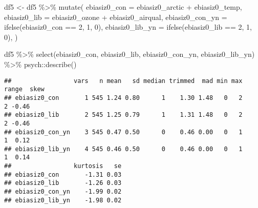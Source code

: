 \documentclass[
]{article}
\newenvironment{Shaded}{\begin{snugshade}}{\end{snugshade}}
\newcommand{\AttributeTok}[1]{\textcolor[rgb]{0.77,0.63,0.00}{#1}}
\newcommand{\DecValTok}[1]{\textcolor[rgb]{0.00,0.00,0.81}{#1}}
\newcommand{\FunctionTok}[1]{\textcolor[rgb]{0.00,0.00,0.00}{#1}}
\newcommand{\NormalTok}[1]{#1}
\newcommand{\OtherTok}[1]{\textcolor[rgb]{0.56,0.35,0.01}{#1}}
\newcommand{\SpecialCharTok}[1]{\textcolor[rgb]{0.00,0.00,0.00}{#1}}
\begin{document}
\begin{Shaded}
\begin{Highlighting}[]
\NormalTok{df5 }\OtherTok{\textless{}{-}}\NormalTok{ df5 }\SpecialCharTok{\%\textgreater{}\%} 
  \FunctionTok{mutate}\NormalTok{(}
    \AttributeTok{ebiasiz0\_con =}\NormalTok{ ebiasiz0\_arctic }\SpecialCharTok{+}\NormalTok{ ebiasiz0\_temp,}
    \AttributeTok{ebiasiz0\_lib =}\NormalTok{ ebiasiz0\_ozone }\SpecialCharTok{+}\NormalTok{ ebiasiz0\_airqual,}
    \AttributeTok{ebiasiz0\_con\_yn =} \FunctionTok{ifelse}\NormalTok{(ebiasiz0\_con }\SpecialCharTok{==} \DecValTok{2}\NormalTok{, }\DecValTok{1}\NormalTok{, }\DecValTok{0}\NormalTok{),}
    \AttributeTok{ebiasiz0\_lib\_yn =} \FunctionTok{ifelse}\NormalTok{(ebiasiz0\_lib }\SpecialCharTok{==} \DecValTok{2}\NormalTok{, }\DecValTok{1}\NormalTok{, }\DecValTok{0}\NormalTok{),}
\NormalTok{  )}

\NormalTok{df5 }\SpecialCharTok{\%\textgreater{}\%} 
  \FunctionTok{select}\NormalTok{(ebiasiz0\_con, ebiasiz0\_lib, ebiasiz0\_con\_yn, ebiasiz0\_lib\_yn) }\SpecialCharTok{\%\textgreater{}\%} 
\NormalTok{  psych}\SpecialCharTok{::}\FunctionTok{describe}\NormalTok{()}
\end{Highlighting}
\end{Shaded}

\begin{verbatim}
##                 vars   n mean   sd median trimmed  mad min max range  skew
## ebiasiz0_con       1 545 1.24 0.80      1    1.30 1.48   0   2     2 -0.46
## ebiasiz0_lib       2 545 1.25 0.79      1    1.31 1.48   0   2     2 -0.46
## ebiasiz0_con_yn    3 545 0.47 0.50      0    0.46 0.00   0   1     1  0.12
## ebiasiz0_lib_yn    4 545 0.46 0.50      0    0.46 0.00   0   1     1  0.14
##                 kurtosis   se
## ebiasiz0_con       -1.31 0.03
## ebiasiz0_lib       -1.26 0.03
## ebiasiz0_con_yn    -1.99 0.02
## ebiasiz0_lib_yn    -1.98 0.02
\end{verbatim}
\end{document}

